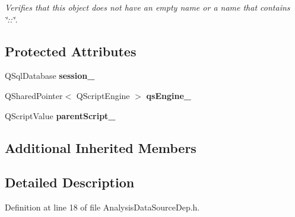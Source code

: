 \begin{DoxyCompactItemize}
\begin{DoxyCompactList}\small\item\em Verifies that this object does not have an empty name or a name that contains \char`\"{}\-::\char`\"{}. \end{DoxyCompactList}\end{DoxyCompactItemize}
\subsection*{Protected Attributes}
\begin{DoxyCompactItemize}
\item 
\hypertarget{class_picto_1_1_analysis_data_source_dep_aa334e115d08478716f0248113dfabe84}{Q\-Sql\-Database {\bfseries session\-\_\-}}\label{class_picto_1_1_analysis_data_source_dep_aa334e115d08478716f0248113dfabe84}

\item 
\hypertarget{class_picto_1_1_analysis_data_source_dep_a997d8a5e22899e10098420814435c594}{Q\-Shared\-Pointer$<$ Q\-Script\-Engine $>$ {\bfseries qs\-Engine\-\_\-}}\label{class_picto_1_1_analysis_data_source_dep_a997d8a5e22899e10098420814435c594}

\item 
\hypertarget{class_picto_1_1_analysis_data_source_dep_a36efa23d230e93d40cf46db6f25d6984}{Q\-Script\-Value {\bfseries parent\-Script\-\_\-}}\label{class_picto_1_1_analysis_data_source_dep_a36efa23d230e93d40cf46db6f25d6984}

\end{DoxyCompactItemize}
\subsection*{Additional Inherited Members}


\subsection{Detailed Description}


Definition at line 18 of file Analysis\-Data\-Source\-Dep.\-h.



